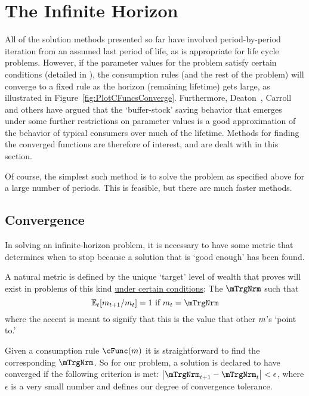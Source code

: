 \hypertarget{the-infinite-horizon}{}
\section{The Infinite Horizon}\label{sec:the-infinite-horizon}

All of the solution methods presented so far have involved period-by-period iteration from an assumed last period of life, as is appropriate for life cycle problems.  However, if the parameter values for the problem satisfy certain conditions (detailed in \cite{BufferStockTheory}), the consumption rules (and the rest of the problem) will converge to a fixed rule as the horizon (remaining lifetime) gets large, as illustrated in Figure~\ref{fig:PlotCFuncsConverge}.  Furthermore, Deaton~\citeyearpar{deatonLiqConstr}, Carroll~\citeyearpar{carroll:brookings,carrollBSLCPIH} and others have argued that the `buffer-stock' saving behavior that emerges under some further restrictions on parameter values is a good approximation of the behavior of typical consumers over much of the lifetime.  Methods for finding the converged functions are therefore of interest, and are dealt with in this section.

Of course, the simplest such method is to solve the problem as
specified above for a large number of periods.  This is feasible, but
there are much faster methods.

\subsection{Convergence}

In solving an infinite-horizon problem, it is necessary to have some
metric that determines when to stop because a solution that is `good
enough' has been found.

A natural metric is defined by the unique `target' level of wealth that \cite{BufferStockTheory} proves
will exist in problems of this kind \href{https://llorracc.github.io/BufferStockTheory#GICNrm}{under certain conditions}: The $\mTrgNrm$ such that
\begin{equation}
  \Ex_t [{\mNrm}_{\prd+1}/\mNrm_t] = 1 \mbox{~if~} \mNrm_t = \mTrgNrm  \label{eq:mTrgNrmet}
\end{equation}
where the accent is meant to signify that this is the value
that other $m$'s `point to.'

Given a consumption rule $\cFunc(\mNrm)$ it is straightforward to find
the corresponding $\mTrgNrm$.  So for our problem, a solution is declared
to have converged if the following criterion is met:
$\left|\mTrgNrm_{\prd+1}-\mTrgNrm_{\prd}\right| < \epsilon$, where $\epsilon$ is
a very small number and defines our degree of convergence tolerance.

